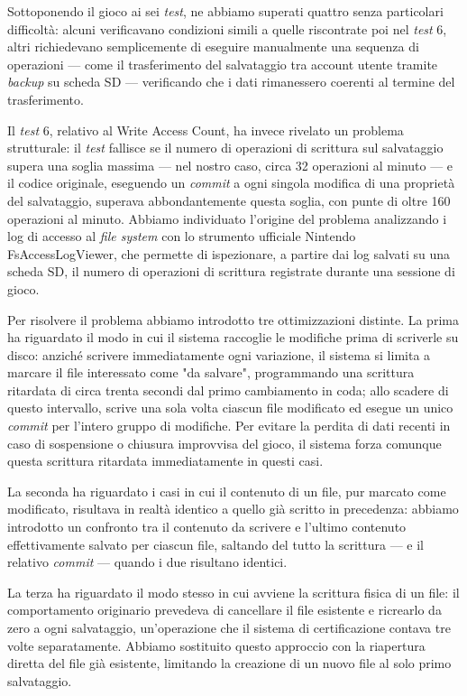 Sottoponendo il gioco ai sei \textit{test}, ne abbiamo superati quattro senza particolari difficoltà: alcuni verificavano condizioni simili a quelle riscontrate poi nel \textit{test} 6, altri richiedevano semplicemente di eseguire manualmente una sequenza di operazioni — come il trasferimento del salvataggio tra account utente tramite \textit{backup} su scheda SD — verificando che i dati rimanessero coerenti al termine del trasferimento.
 
Il \textit{test} 6, relativo al Write Access Count, ha invece rivelato un problema strutturale: il \textit{test} fallisce se il numero di operazioni di scrittura sul salvataggio supera una soglia massima — nel nostro caso, circa 32 operazioni al minuto — e il codice originale, eseguendo un \textit{commit} a ogni singola modifica di una proprietà del salvataggio, superava abbondantemente questa soglia, con punte di oltre 160 operazioni al minuto. Abbiamo individuato l'origine del problema analizzando i log di accesso al \textit{file system} con lo strumento ufficiale Nintendo FsAccessLogViewer, che permette di ispezionare, a partire dai log salvati su una scheda SD, il numero di operazioni di scrittura registrate durante una sessione di gioco.
 
Per risolvere il problema abbiamo introdotto tre ottimizzazioni distinte. La prima ha riguardato il modo in cui il sistema raccoglie le modifiche prima di scriverle su disco: anziché scrivere immediatamente ogni variazione, il sistema si limita a marcare il file interessato come "da salvare", programmando una scrittura ritardata di circa trenta secondi dal primo cambiamento in coda; allo scadere di questo intervallo, scrive una sola volta ciascun file modificato ed esegue un unico \textit{commit} per l'intero gruppo di modifiche. Per evitare la perdita di dati recenti in caso di sospensione o chiusura improvvisa del gioco, il sistema forza comunque questa scrittura ritardata immediatamente in questi casi.
 
La seconda ha riguardato i casi in cui il contenuto di un file, pur marcato come modificato, risultava in realtà identico a quello già scritto in precedenza: abbiamo introdotto un confronto tra il contenuto da scrivere e l'ultimo contenuto effettivamente salvato per ciascun file, saltando del tutto la scrittura — e il relativo \textit{commit} — quando i due risultano identici.
 
La terza ha riguardato il modo stesso in cui avviene la scrittura fisica di un file: il comportamento originario prevedeva di cancellare il file esistente e ricrearlo da zero a ogni salvataggio, un'operazione che il sistema di certificazione contava tre volte separatamente. Abbiamo sostituito questo approccio con la riapertura diretta del file già esistente, limitando la creazione di un nuovo file al solo primo salvataggio.
 
